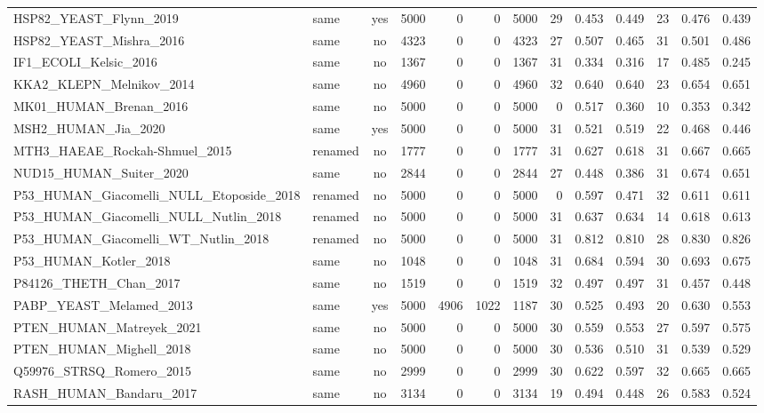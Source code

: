 \documentclass[11pt,a4paper]{article}
\begin{document}
\begin{landscape}
\begin{longtable}{llcrrrrrrrrrr}
HSP82\_YEAST\_Flynn\_2019 & same & yes & 5000 & 0 & 0 & 5000 & 29 & 0.453 & 0.449 & 23 & 0.476 & 0.439 \\
HSP82\_YEAST\_Mishra\_2016 & same & no & 4323 & 0 & 0 & 4323 & 27 & 0.507 & 0.465 & 31 & 0.501 & 0.486 \\
IF1\_ECOLI\_Kelsic\_2016 & same & no & 1367 & 0 & 0 & 1367 & 31 & 0.334 & 0.316 & 17 & 0.485 & 0.245 \\
KKA2\_KLEPN\_Melnikov\_2014 & same & no & 4960 & 0 & 0 & 4960 & 32 & 0.640 & 0.640 & 23 & 0.654 & 0.651 \\
MK01\_HUMAN\_Brenan\_2016 & same & no & 5000 & 0 & 0 & 5000 & 0 & 0.517 & 0.360 & 10 & 0.353 & 0.342 \\
MSH2\_HUMAN\_Jia\_2020 & same & yes & 5000 & 0 & 0 & 5000 & 31 & 0.521 & 0.519 & 22 & 0.468 & 0.446 \\
MTH3\_HAEAE\_Rockah-Shmuel\_2015 & renamed & no & 1777 & 0 & 0 & 1777 & 31 & 0.627 & 0.618 & 31 & 0.667 & 0.665 \\
NUD15\_HUMAN\_Suiter\_2020 & same & no & 2844 & 0 & 0 & 2844 & 27 & 0.448 & 0.386 & 31 & 0.674 & 0.651 \\
P53\_HUMAN\_Giacomelli\_NULL\_Etoposide\_2018 & renamed & no & 5000 & 0 & 0 & 5000 & 0 & 0.597 & 0.471 & 32 & 0.611 & 0.611 \\
P53\_HUMAN\_Giacomelli\_NULL\_Nutlin\_2018 & renamed & no & 5000 & 0 & 0 & 5000 & 31 & 0.637 & 0.634 & 14 & 0.618 & 0.613 \\
P53\_HUMAN\_Giacomelli\_WT\_Nutlin\_2018 & renamed & no & 5000 & 0 & 0 & 5000 & 31 & 0.812 & 0.810 & 28 & 0.830 & 0.826 \\
P53\_HUMAN\_Kotler\_2018 & same & no & 1048 & 0 & 0 & 1048 & 31 & 0.684 & 0.594 & 30 & 0.693 & 0.675 \\
P84126\_THETH\_Chan\_2017 & same & no & 1519 & 0 & 0 & 1519 & 32 & 0.497 & 0.497 & 31 & 0.457 & 0.448 \\
PABP\_YEAST\_Melamed\_2013 & same & yes & 5000 & 4906 & 1022 & 1187 & 30 & 0.525 & 0.493 & 20 & 0.630 & 0.553 \\
PTEN\_HUMAN\_Matreyek\_2021 & same & no & 5000 & 0 & 0 & 5000 & 30 & 0.559 & 0.553 & 27 & 0.597 & 0.575 \\
PTEN\_HUMAN\_Mighell\_2018 & same & no & 5000 & 0 & 0 & 5000 & 30 & 0.536 & 0.510 & 31 & 0.539 & 0.529 \\
Q59976\_STRSQ\_Romero\_2015 & same & no & 2999 & 0 & 0 & 2999 & 30 & 0.622 & 0.597 & 32 & 0.665 & 0.665 \\
RASH\_HUMAN\_Bandaru\_2017 & same & no & 3134 & 0 & 0 & 3134 & 19 & 0.494 & 0.448 & 26 & 0.583 & 0.524 \\

\end{longtable}
\end{landscape}
\end{document}
